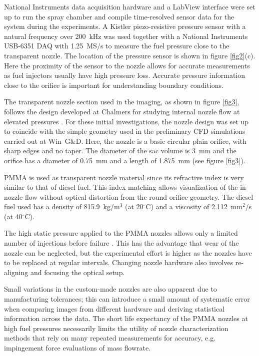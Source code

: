 \documentclass[letterpaper,twocolumn,10pt]{ilass}
\begin{document}
National Instruments data acquisition hardware and a LabView interface were set up to run
the spray chamber and compile time-resolved sensor data for the system during the experiments.
%
A Kistler piezo-resistive pressure sensor with a natural frequency over 200~kHz was used
together with a National Instruments USB-6351 DAQ with 1.25~MS/s to measure the fuel pressure
close to the transparent nozzle. The location of the pressure sensor is shown in figure
\ref{fig2}(c).
Here the proximity of the sensor to the nozzle allows for accurate measurements as
fuel injectors usually have high pressure loss. Accurate pressure information close to the
orifice is important for understanding boundary conditions.
%

The transparent nozzle section used in the imaging, as shown in figure \ref{fig3},
follows the design developed at Chalmers for studying internal nozzle flow at elevated
pressures \cite{Falgout2016}.
%
For these initial investigations, the nozzle design was set up to coincide with the
simple geometry used in the preliminary CFD simulations carried out at Win~G\&D.
%
Here, the nozzle is a basic circular plain orifice, with sharp edges and no taper.
The diameter of the sac volume is 3~mm and the orifice has a diameter of 0.75~mm
and a length of 1.875~mm (see figure \ref{fig3}).
%

PMMA is used as transparent nozzle material since its refractive index is very similar
to that of diesel fuel. This index matching allows visualization of the in-nozzle flow
without optical distortion from the round orifice geometry.
%
The diesel fuel used has a density of 815.9~kg/m$^3$ (at 20$^{\circ}$C) and a
viscosity of 2.112~mm$^2$/s (at 40$^{\circ}$C).
%

The high static pressure applied to the PMMA nozzles allows only a limited number of injections
before failure \cite{Falgout2016}. This has the advantage that wear of the nozzle can be
neglected, but the experimental effort is higher as the nozzles have to be replaced at regular
intervals. Changing nozzle hardware also involves re-aligning and focusing the optical setup.
%

Small variations in the custom-made nozzles are also apparent due to manufacturing tolerances; this can introduce a small amount of systematic error when comparing images from different
hardware and deriving statistical information across the data.
%
The short life expectancy of the PMMA nozzles at high fuel pressures necessarily limits
the utility of nozzle characterization methods that rely on many repeated measurements
for accuracy, e.g. impingement force evaluations of mass flowrate.
%
\end{document}
